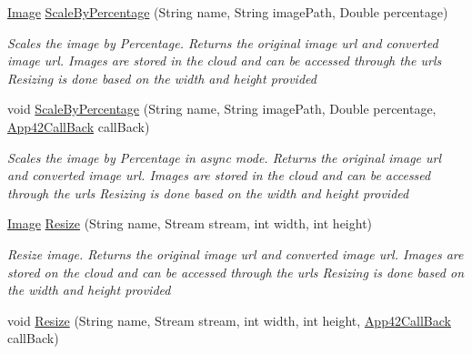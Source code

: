 \begin{DoxyCompactItemize}
\hyperlink{classcom_1_1shephertz_1_1app42_1_1paas_1_1sdk_1_1csharp_1_1image_processor_1_1_image}{Image} \hyperlink{classcom_1_1shephertz_1_1app42_1_1paas_1_1sdk_1_1csharp_1_1image_processor_1_1_image_processor_service_a918dac7c8e039dd04aa043e4f557d59d}{Scale\+By\+Percentage} (String name, String image\+Path, Double percentage)
\begin{DoxyCompactList}\small\item\em Scales the image by Percentage. Returns the original image url and converted image url. Images are stored in the cloud and can be accessed through the urls Resizing is done based on the width and height provided \end{DoxyCompactList}\item 
void \hyperlink{classcom_1_1shephertz_1_1app42_1_1paas_1_1sdk_1_1csharp_1_1image_processor_1_1_image_processor_service_aeaee8682d4d1c1398a583114d02a3406}{Scale\+By\+Percentage} (String name, String image\+Path, Double percentage, \hyperlink{interfacecom_1_1shephertz_1_1app42_1_1paas_1_1sdk_1_1csharp_1_1_app42_call_back}{App42\+Call\+Back} call\+Back)
\begin{DoxyCompactList}\small\item\em Scales the image by Percentage in async mode. Returns the original image url and converted image url. Images are stored in the cloud and can be accessed through the urls Resizing is done based on the width and height provided \end{DoxyCompactList}\item 
\hyperlink{classcom_1_1shephertz_1_1app42_1_1paas_1_1sdk_1_1csharp_1_1image_processor_1_1_image}{Image} \hyperlink{classcom_1_1shephertz_1_1app42_1_1paas_1_1sdk_1_1csharp_1_1image_processor_1_1_image_processor_service_a93269ae2779fbf1e8c01b377a14f8e74}{Resize} (String name, Stream stream, int width, int height)
\begin{DoxyCompactList}\small\item\em Resize image. Returns the original image url and converted image url. Images are stored on the cloud and can be accessed through the urls Resizing is done based on the width and height provided \end{DoxyCompactList}\item 
void \hyperlink{classcom_1_1shephertz_1_1app42_1_1paas_1_1sdk_1_1csharp_1_1image_processor_1_1_image_processor_service_ae7fbd6956dc2c223b4909905efbf191f}{Resize} (String name, Stream stream, int width, int height, \hyperlink{interfacecom_1_1shephertz_1_1app42_1_1paas_1_1sdk_1_1csharp_1_1_app42_call_back}{App42\+Call\+Back} call\+Back)

\end{DoxyCompactItemize}

